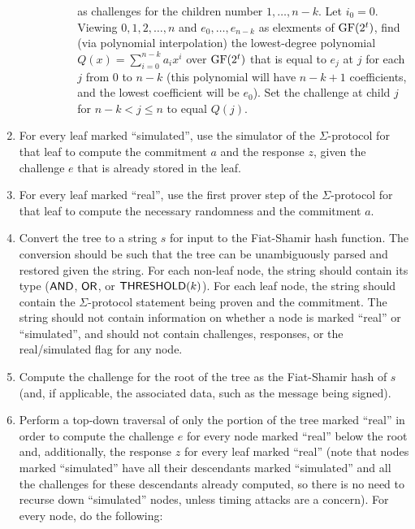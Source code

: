 \documentclass[11pt]{llncs}
\begin{document}
\begin{enumerate}
\begin{itemize}
\begin{itemize}
\begin{enumerate}
	         as challenges for the children number $1, \dots, n-k$.
	         Let $i_0 = 0$. Viewing $0, 1, 2, \dots, n$ and $e_0, \dots, e_{n-k}$ as elexments of $\mathrm{GF}(2^t)$, find (via polynomial interpolation) the
	          lowest-degree polynomial $Q(x)=\sum_{i=0}^{n-k} a_i x^i $ over $\mathrm{GF}(2^t)$ that is equal to $e_j$ at $j$ for each $j$ from
	          $0$ to $n-k$ (this polynomial will have $n-k+1$ coefficients, and the lowest coefficient will be $e_0$). Set the challenge at child
	          $j$ for $n-k<j\le n$ to equal $Q(j)$.
 	   \end{enumerate} 
        \end{itemize}
    \end{itemize}
    
    \item For every leaf marked ``simulated'', use the simulator of the $\Sigma$-protocol for that leaf to compute the commitment $a$ and the response $z$, given the challenge $e$ that is already stored in the leaf.
    
    \item For every leaf marked ``real'', use the first prover step of the $\Sigma$-protocol for that leaf to compute the necessary randomness and the commitment $a$.
    
    \item \label{step:fs}  Convert the tree to a string $s$ for input to the Fiat-Shamir hash function. The conversion should be such that the tree can be unambiguously parsed and restored given the string. For each non-leaf node, the string should contain its type ($\mathsf{AND}$, $\mathsf{OR}$, or $\mathsf{THRESHOLD}(k)$). For each leaf node, the string should contain the $\Sigma$-protocol statement being proven and the commitment. The string should not contain information on whether a node is marked ``real'' or ``simulated'', and should not contain challenges, responses, or the real/simulated flag for any node.
    
    \item Compute the challenge for the root of the tree as the Fiat-Shamir hash of $s$ (and, if applicable,  the associated data, such as the message being signed). 
    
    \item Perform a top-down traversal of only the portion of the tree marked ``real'' in order to compute the challenge $e$ for every node marked ``real'' below the root and, additionally, the response $z$ for every leaf marked ``real'' (note that nodes marked ``simulated'' have all their descendants marked ``simulated'' and all the challenges for these descendants already computed, so there is no need to recurse down ``simulated'' nodes, unless timing attacks are a concern). For every node, do the following:
    

\end{enumerate}
\end{document}
